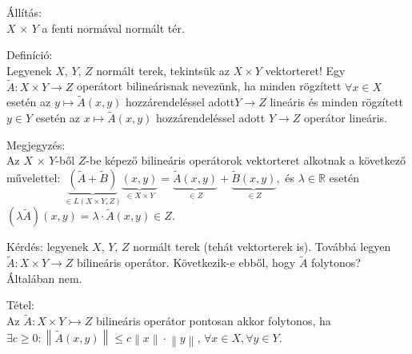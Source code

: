 \documentclass[12pt,a4paper]{scrartcl}
\newenvironment{definicio}{}{}
\newenvironment{tetel}{}{}
\newenvironment{allitas}{}{}
\newenvironment{megjegyzes}{}{}
\begin{document}
\begin{allitas}

Állítás:\\
\(X\) × \(Y\) a fenti normával normált tér.

\end{allitas}

\begin{definicio}

Definíció:\\
Legyenek \(X\), \(Y\), \(Z\) normált terek, tekintsük az \(X \times Y\)
vektorteret! Egy
\(\left. \widetilde{A}:X \times Y\rightarrow Z \right.\) operátort
bilineárisnak nevezünk, ha minden rögzített \(\forall x \in X\) esetén
az \(\left. y\mapsto\widetilde{A}\left( {x,y} \right) \right.\)
hozzárendeléssel adott\(\left. Y\rightarrow Z \right.\) lineáris és
minden rögzített \(y \in Y\) esetén az
\(\left. x\mapsto\widetilde{A}\left( {x,y} \right) \right.\)
hozzárendeléssel adott \(\left. Y\rightarrow Z \right.\) operátor
lineáris.

\end{definicio}

\begin{megjegyzes}

Megjegyzés:\\
Az \(X\) × \(Y\)-ből \(Z\)-be képező bilineáris operátorok vektorteret
alkotnak a következő művelettel:
\(\underbrace {\left( {\tilde A + \tilde B} \right)}_{ \in L\left( {X \times Y,Z} \right)}\underbrace {\left( {x,y} \right)}_{ \in X \times Y} = \underbrace {\tilde A\left( {x,y} \right)}_{ \in Z} + \underbrace {\tilde B\left( {x,y} \right)}_{ \in Z},\)
és \(\lambda \in {\mathbb{R}}\) esetén
\(\left( {\lambda\widetilde{A}} \right)\left( {x,y} \right) = \lambda \cdot \widetilde{A}\left( {x,y} \right) \in Z\).

\end{megjegyzes}

Kérdés: legyenek \(X\), \(Y\), \(Z\) normált terek (tehát vektorterek
is). Továbbá legyen
\(\left. \widetilde{A}:X \times Y\rightarrow Z \right.\) bilineáris
operátor. Következik-e ebből, hogy \(\widetilde{A}\) folytonos?
Általában nem.

\begin{tetel}

Tétel:\\
Az \(\left. \widetilde{A}:X \times Y\rightarrowtail Z \right.\)
bilineáris operátor pontosan akkor folytonos, ha
\(\exists c \geq 0:\left\| {\widetilde{A}\left( {x,y} \right)} \right\| \leq c\left\| x \right\| \cdot \left\| y \right\|\),
\(\forall x \in X,\forall y \in Y.\)

\end{tetel}
\end{document}
